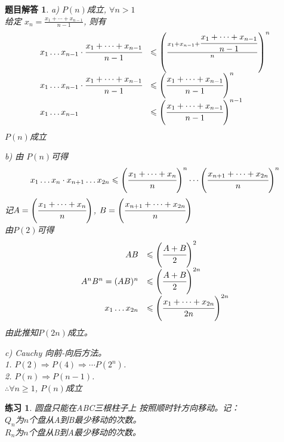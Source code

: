 \documentclass[mode=geye, chinesefont=founder]{elegantnote}
\newtheorem{exercise}{练习}
\newtheorem{answer}{题目解答}
\begin{document}
\begin{answer}
	a) $ P(n) $成立, $ \forall n>1 $\\
	给定 $ x_n = \frac{x_{1}+\cdots+x_{n-1}}{n-1} $, 则有
	\begin{equation*}
		\begin{array}{ll}
			x_1 \dots x_{n-1} \cdot \cfrac{x_{1}+\dots+x_{n-1}}{n-1} 
			&\leqslant \left( \frac{	x_1 + x_{n-1} + \cfrac{x_{1}+\dots+x_{n-1}}{n-1} }{n} \right) ^n \\
			x_1 \dots x_{n-1} \cdot \cfrac{x_{1}+\dots+x_{n-1}}{n-1}
			&\leqslant \left(  \cfrac{x_{1}+\dots+x_{n-1}}{n-1} \right) ^n \\
			x_1 \dots x_{n-1}
			&\leqslant \left(  \cfrac{x_{1}+\dots+x_{n-1}}{n-1} \right) ^{n-1}\\
		\end{array}
	\end{equation*}
	$ P(n) $成立
	
	b) 由 $ P(n) $可得
	\begin{equation*}
		x_{1} \dots x_{n} \cdot x_{n+1} \dots x_{2n} \leqslant \left(\cfrac{x_{1} + \dots + x_{n}}{n}\right)^n \cdots \left(\cfrac{x_{n+1} + \dots + x_{2n}}{n}\right)^n
	\end{equation*}
	记$ A = \left(\cfrac{x_{1} + \dots + x_{n}}{n}\right) $,  $ B = \left(\cfrac{x_{n+1} + \dots + x_{2n}}{n}\right) $\\
	由$ P(2) $可得
	\begin{equation*}
		\begin{array}{rl}
			AB &\leqslant \left(\cfrac{A+B}{2}\right)^{2}  \\
			A^{n} B^{n} = (AB)^{n} &\leqslant \left(\cfrac{A+B}{2}\right)^{2n} \\
			x_{1}\dots x_{2n} &\leqslant \left(\cfrac{x_{1}+\dots +x_{2n}}{2n}\right)^{2n} \\
		\end{array}
	\end{equation*}
	由此推知$ P(2n) $成立。
	
	c) Cauchy 向前-向后方法。\\
	1. $ P(2)\Rightarrow P(4)\Rightarrow\cdots P(2^n) $. \\
	2. $ P(n)\Rightarrow P(n-1) $.\\
	$ \therefore \forall n\geqslant 1 $, $ P(n) $成立
\end{answer}

\begin{exercise}
	圆盘只能在ABC三根柱子上 按照顺时针方向移动。记：\\
	$ Q_{n} $为$ n $个盘从A到B最少移动的次数。\\
	$ R_{n} $为$ n $个盘从B到A最少移动的次数。	
\end{exercise}
\end{document}
